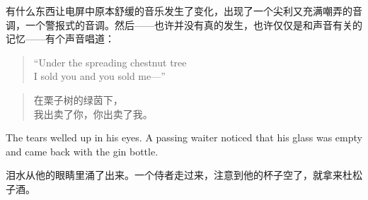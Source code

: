 \begin{paracol}{2}
\switchcolumn

有什么东西让电屏中原本舒缓的音乐发生了变化，出现了一个尖利又充满嘲弄的音调，一个警报式的音调。然后——也许并没有真的发生，也许仅仅是和声音有关的记忆——有个声音唱道：

\switchcolumn*

\begin{quotation}
 \noindent ``Under the spreading chestnut tree\\
  I sold you and you sold me---''
\end{quotation}

\switchcolumn

\begin{quotation}
\noindent 在栗子树的绿茵下，\\
我出卖了你，你出卖了我。
\end{quotation}

\switchcolumn*

The tears welled up in his eyes. A passing waiter noticed that his glass
was empty and came back with the gin bottle.

\switchcolumn


泪水从他的眼睛里涌了出来。一个侍者走过来，注意到他的杯子空了，就拿来杜松子酒。

\switchcolumn*


\end{paracol}
